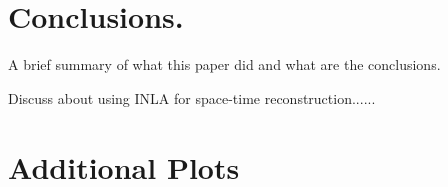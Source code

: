 \documentclass[11pt]{amsart}
\theoremstyle{plain}
\theoremstyle{definition}
\theoremstyle{remark}
\begin{document}








\section{Conclusions.}
\label{sec:conclusions}

A brief summary of what this paper did and what are the conclusions. 

Discuss about using INLA for space-time reconstruction......







\newpage
\appendix

\section{Additional Plots}
\end{document}
